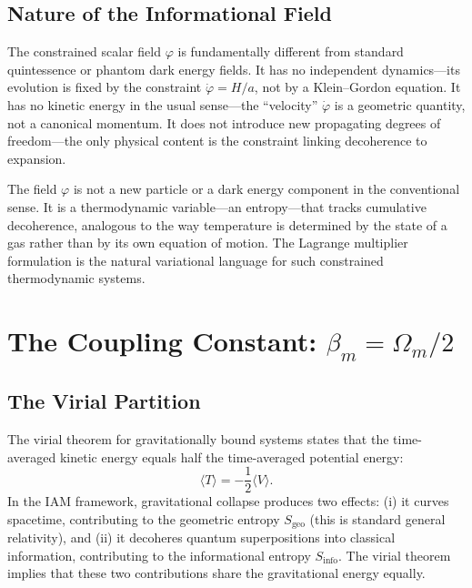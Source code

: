 \documentclass[11pt]{article}
\begin{document}
\subsection{Nature of the Informational Field}

The constrained scalar field $\varphi$ is fundamentally different from
standard quintessence or phantom dark energy fields.  It has no independent
dynamics---its evolution is fixed by the constraint $\dot{\varphi} = H/a$,
not by a Klein--Gordon equation.  It has no kinetic energy in the usual
sense---the ``velocity'' $\dot{\varphi}$ is a geometric quantity, not a
canonical momentum.  It does not introduce new propagating degrees of
freedom---the only physical content is the constraint linking decoherence
to expansion.

The field $\varphi$ is not a new particle or a dark energy component in the
conventional sense.  It is a thermodynamic variable---an entropy---that
tracks cumulative decoherence, analogous to the way temperature is
determined by the state of a gas rather than by its own equation of motion.
The Lagrange multiplier formulation is the natural variational language for
such constrained thermodynamic systems.


\section{The Coupling Constant: $\beta_m = \Omega_m/2$}
\label{sec:coupling}

\subsection{The Virial Partition}

The virial theorem for gravitationally bound systems states that the
time-averaged kinetic energy equals half the time-averaged potential energy:
\begin{equation}
\langle T \rangle = -\frac{1}{2}\langle V \rangle.
\label{eq:virial_formal}
\end{equation}
In the IAM framework, gravitational collapse produces two effects: (i) it
curves spacetime, contributing to the geometric entropy $S_\mathrm{geo}$
(this is standard general relativity), and (ii) it decoheres quantum
superpositions into classical information, contributing to the informational
entropy $S_\mathrm{info}$.  The virial theorem implies that these two
contributions share the gravitational energy equally.
\end{document}
